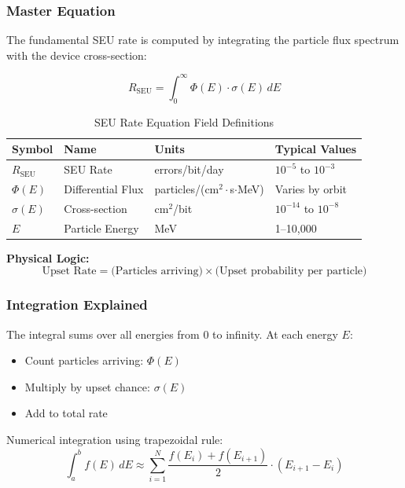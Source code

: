 \documentclass[11pt,a4paper]{article}
\begin{document}
\subsubsection{Master Equation}

The fundamental SEU rate is computed by integrating the particle flux spectrum with the device cross-section:

\begin{equation}
R_{\text{SEU}} = \int_0^\infty \Phi(E) \cdot \sigma(E) \, dE
\end{equation}

\begin{table}[htbp]
\centering
\caption{SEU Rate Equation Field Definitions}
\begin{tabular}{@{}llll@{}}
\toprule
\textbf{Symbol} & \textbf{Name} & \textbf{Units} & \textbf{Typical Values} \\ \midrule
$R_{\text{SEU}}$ & SEU Rate & errors/bit/day & $10^{-5}$ to $10^{-3}$ \\
$\Phi(E)$ & Differential Flux & particles/(cm$^2\cdot$s$\cdot$MeV) & Varies by orbit \\
$\sigma(E)$ & Cross-section & cm$^2$/bit & $10^{-14}$ to $10^{-8}$ \\
$E$ & Particle Energy & MeV & 1--10,000 \\ \bottomrule
\end{tabular}
\end{table}

\textbf{Physical Logic:}
\begin{equation}
\boxed{\text{Upset Rate} = \text{(Particles arriving)} \times \text{(Upset probability per particle)}}
\end{equation}

\subsubsection{Integration Explained}

The integral sums over all energies from 0 to infinity. At each energy $E$:
\begin{itemize}
    \item Count particles arriving: $\Phi(E)$
    \item Multiply by upset chance: $\sigma(E)$
    \item Add to total rate
\end{itemize}

Numerical integration using trapezoidal rule:
\begin{equation}
\int_a^b f(E) \, dE \approx \sum_{i=1}^{N} \frac{f(E_i) + f(E_{i+1})}{2} \cdot (E_{i+1} - E_i)
\end{equation}
\end{document}
